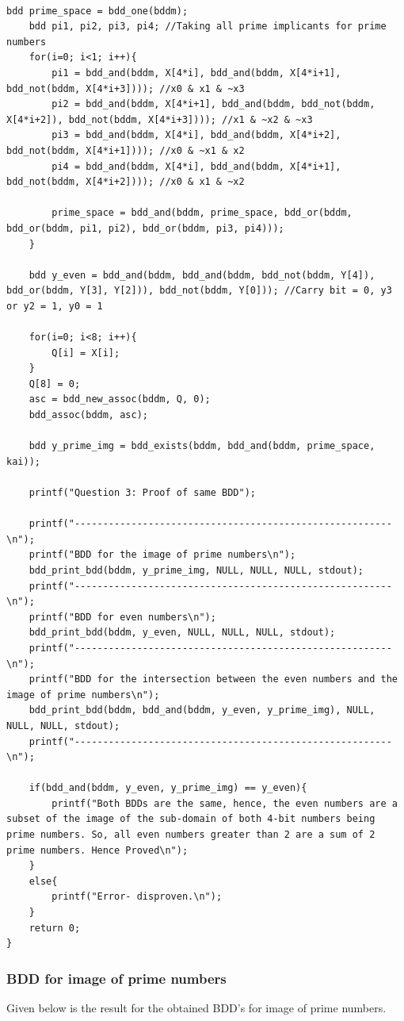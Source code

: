 \documentclass[12pt]{article}
\begin{document}
\begin{verbatim}

bdd prime_space = bdd_one(bddm);
	bdd pi1, pi2, pi3, pi4; //Taking all prime implicants for prime numbers
	for(i=0; i<1; i++){
		pi1 = bdd_and(bddm, X[4*i], bdd_and(bddm, X[4*i+1], bdd_not(bddm, X[4*i+3]))); //x0 & x1 & ~x3 
		pi2 = bdd_and(bddm, X[4*i+1], bdd_and(bddm, bdd_not(bddm, X[4*i+2]), bdd_not(bddm, X[4*i+3]))); //x1 & ~x2 & ~x3
		pi3 = bdd_and(bddm, X[4*i], bdd_and(bddm, X[4*i+2], bdd_not(bddm, X[4*i+1]))); //x0 & ~x1 & x2
		pi4 = bdd_and(bddm, X[4*i], bdd_and(bddm, X[4*i+1], bdd_not(bddm, X[4*i+2]))); //x0 & x1 & ~x2
		
		prime_space = bdd_and(bddm, prime_space, bdd_or(bddm, bdd_or(bddm, pi1, pi2), bdd_or(bddm, pi3, pi4)));
	}
	
	bdd y_even = bdd_and(bddm, bdd_and(bddm, bdd_not(bddm, Y[4]), bdd_or(bddm, Y[3], Y[2])), bdd_not(bddm, Y[0])); //Carry bit = 0, y3 or y2 = 1, y0 = 1
	
	for(i=0; i<8; i++){
		Q[i] = X[i];
	}
	Q[8] = 0;
	asc = bdd_new_assoc(bddm, Q, 0);
	bdd_assoc(bddm, asc);
	
	bdd y_prime_img = bdd_exists(bddm, bdd_and(bddm, prime_space, kai));
	
	printf("Question 3: Proof of same BDD");
	
	printf("--------------------------------------------------------\n");
	printf("BDD for the image of prime numbers\n");
	bdd_print_bdd(bddm, y_prime_img, NULL, NULL, NULL, stdout);
	printf("--------------------------------------------------------\n");
	printf("BDD for even numbers\n");
	bdd_print_bdd(bddm, y_even, NULL, NULL, NULL, stdout);
	printf("--------------------------------------------------------\n");
	printf("BDD for the intersection between the even numbers and the image of prime numbers\n");
	bdd_print_bdd(bddm, bdd_and(bddm, y_even, y_prime_img), NULL, NULL, NULL, stdout);
	printf("--------------------------------------------------------\n");
	
	if(bdd_and(bddm, y_even, y_prime_img) == y_even){
		printf("Both BDDs are the same, hence, the even numbers are a subset of the image of the sub-domain of both 4-bit numbers being prime numbers. So, all even numbers greater than 2 are a sum of 2 prime numbers. Hence Proved\n");
	}
	else{
		printf("Error- disproven.\n");
	}
	return 0;
}
\end{verbatim}

\subsubsection{BDD for image of prime numbers}
Given below is the result for the obtained BDD's for image of prime numbers.\\
\end{document}
